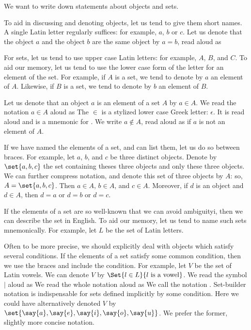 
\sbasic



\sstart



We want to write down
statements about objects
and sets.


To aid in discussing and
denoting objects, let
us tend to give them
short names.
A single Latin
letter regularly suffices:
for example,
$a$, $b$ or $c$.
Let us denote that
the object $a$ and
the object $b$ are
the same object
by $a = b$,
read aloud as

For sets,
let us tend to use
upper case Latin letters:
for example,
$A$, $B$, and $C$.
To aid our memory,
let us tend to use the lower
case form of the letter for
an element of the set.
For example,
if $A$ is a set,
we tend to denote by
$a$ an element of $A$.
Likewise, if $B$ is a set,
we tend to denote
by $b$ an element of $B$.


Let us denote that
an object $a$
is an element of a set $A$
by $a \in A$.
We read the notation
$a \in A$ aloud as 
The $\in$ is a stylized
lower case Greek letter: $\epsilon$.
It is
read aloud  and
is a mnemonic for .
We write $a \not\in A$, read aloud
as  if $a$ is not
an element of $A$.

If we have named
the elements of a set,
and can list them,
let us do so between braces.
For example,
let $a$, $b$, and $c$
be three distinct objects.
Denote by $\set{a, b, c}$
the set containing theses
three objects and only these
three objects.
We can further compress notation,
and denote this set of
three objects by $A$:
so, $A = \set{a, b, c}$.
Then $a \in A$,
$b \in A$, and $c \in A$.
Moreover, if $d$
is an object and
$d \in A$, then $d = a$
or $d = b$ or $d = c$.

If the elements of a set are
so well-known that we can
avoid ambiguityi, then we can
describe the set in English.
To aid our memory,
let us tend to name such sets
mnemonically.
For example,
let $L$ be the set of Latin letters.

Often to be more precise, we should
explicitly deal with objects which
satisfy several conditions.
If the elements of a set satisfy
some common condition, then we use
the braces and include the condition.
For example, let $V$ be the set of
Latin vowels.
We can denote $V$ by
$\Set{l \in L}{l \text{ is a vowel}}$.
We read the symbol $\mid$ aloud as
We read the whole notation aloud as
We call the notation
.
Set-builder notation is indispensable for
sets defined implicitly by some condition.
Here we could have alternatively denoted
$V$ by
$\set{\say{a},\say{e},\say{i},\say{o},\say{u}}$.
We prefer the former, slightly more concise notation.


\strats
